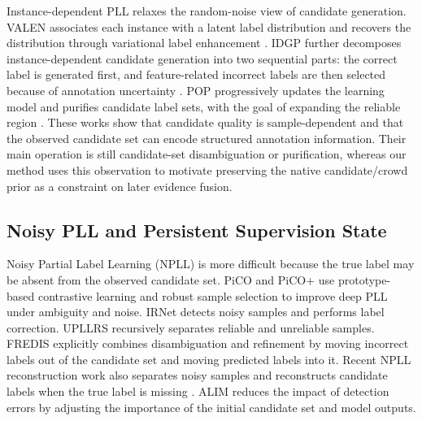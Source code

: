 Instance-dependent PLL relaxes the random-noise view of candidate generation.
VALEN associates each instance with a latent label distribution and recovers the
distribution through variational label enhancement \cite{xu2021idpll}. IDGP
further decomposes instance-dependent candidate generation into two sequential
parts: the correct label is generated first, and feature-related incorrect
labels are then selected because of annotation uncertainty \cite{qiao2023idgp}.
POP progressively updates the learning model and purifies candidate label sets,
with the goal of expanding the reliable region \cite{xu2022pop}. These works
show that candidate quality is sample-dependent and that the observed candidate
set can encode structured annotation information. Their main operation is still
candidate-set disambiguation or purification, whereas our method uses this
observation to motivate preserving the native candidate/crowd prior as a
constraint on later evidence fusion.

\subsection{Noisy PLL and Persistent Supervision State}
Noisy Partial Label Learning (NPLL) is more difficult because the true label may
be absent from the observed candidate set. PiCO \cite{wang2022pico} and PiCO+
\cite{wang2022pico+} use prototype-based contrastive learning and robust sample
selection to improve deep PLL under ambiguity and noise. IRNet
\cite{lian2023irnet} detects noisy samples and performs label correction.
UPLLRS \cite{Shi2023Unreliable} recursively separates reliable and unreliable
samples. FREDIS \cite{qiao2023fredis} explicitly combines disambiguation and
refinement by moving incorrect labels out of the candidate set and moving
predicted labels into it. Recent NPLL reconstruction work also separates noisy
samples and reconstructs candidate labels when the true label is missing
\cite{peng2025noise}. ALIM \cite{xu2023alim} reduces the impact of detection
errors by adjusting the importance of the initial candidate set and model
outputs.

